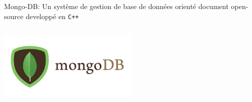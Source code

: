 \documentclass[12pt]{report}
\begin{document}
		Mongo-DB: Un système de gestion de base de données orienté document open-source developpé en {\tt C++}
		\begin{center}
			\includegraphics[scale=1, width=0.5\textwidth, height=4cm]{mongo}
			\label{mongo}
		\end{center}
		
		
\end{document}
